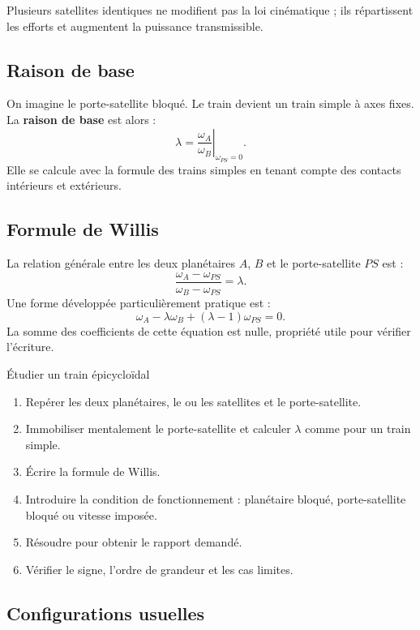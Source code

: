 Plusieurs satellites identiques ne modifient pas la loi cinématique ; ils
répartissent les efforts et augmentent la puissance transmissible.

\subsection{Raison de base}

On imagine le porte-satellite bloqué. Le train devient un train simple à
axes fixes. La \textbf{raison de base} est alors :
\[
\boxed{\lambda=
\left.\frac{\omega_A}{\omega_B}\right|_{\omega_{PS}=0}.}
\]
Elle se calcule avec la formule des trains simples en tenant compte des
contacts intérieurs et extérieurs.

\subsection{Formule de Willis}

La relation générale entre les deux planétaires $A$, $B$ et le
porte-satellite $PS$ est :
\[
\boxed{\frac{\omega_A-\omega_{PS}}
{\omega_B-\omega_{PS}}=\lambda.}
\]
Une forme développée particulièrement pratique est :
\[
\boxed{\omega_A-\lambda\omega_B+(\lambda-1)\omega_{PS}=0.}
\]
La somme des coefficients de cette équation est nulle, propriété utile
pour vérifier l'écriture.

\begin{TLThreeMethod}{Étudier un train épicycloïdal}
\begin{enumerate}
  \item Repérer les deux planétaires, le ou les satellites et le porte-satellite.
  \item Immobiliser mentalement le porte-satellite et calculer $\lambda$ comme pour un train simple.
  \item Écrire la formule de Willis.
  \item Introduire la condition de fonctionnement : planétaire bloqué, porte-satellite bloqué ou vitesse imposée.
  \item Résoudre pour obtenir le rapport demandé.
  \item Vérifier le signe, l'ordre de grandeur et les cas limites.
\end{enumerate}
\end{TLThreeMethod}

\subsection{Configurations usuelles}


